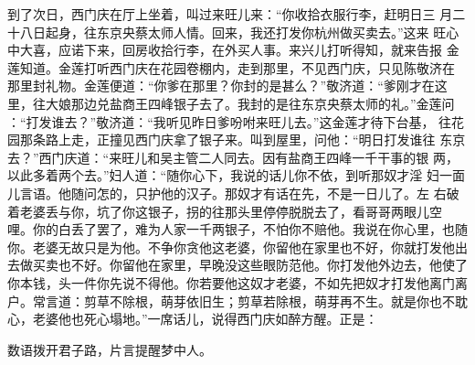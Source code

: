 到了次日，西门庆在厅上坐着，叫过来旺儿来：“你收拾衣服行李，赶明日三
月二十八日起身，往东京央蔡太师人情。回来，我还打发你杭州做买卖去。”这来
旺心中大喜，应诺下来，回房收拾行李，在外买人事。来兴儿打听得知，就来告报
金莲知道。金莲打听西门庆在花园卷棚内，走到那里，不见西门庆，只见陈敬济在
那里封礼物。金莲便道：“你爹在那里？你封的是甚么？”敬济道：“爹刚才在这
里，往大娘那边兑盐商王四峰银子去了。我封的是往东京央蔡太师的礼。”金莲问
：“打发谁去？”敬济道：“我听见昨日爹吩咐来旺儿去。”这金莲才待下台基，
往花园那条路上走，正撞见西门庆拿了银子来。叫到屋里，问他：“明日打发谁往
东京去？”西门庆道：“来旺儿和吴主管二人同去。因有盐商王四峰一千干事的银
两，以此多着两个去。”妇人道：“随你心下，我说的话儿你不依，到听那奴才淫
妇一面儿言语。他随问怎的，只护他的汉子。那奴才有话在先，不是一日儿了。左
右破着老婆丢与你，坑了你这银子，拐的往那头里停停脱脱去了，看哥哥两眼儿空
哩。你的白丢了罢了，难为人家一千两银子，不怕你不赔他。我说在你心里，也随
你。老婆无故只是为他。不争你贪他这老婆，你留他在家里也不好，你就打发他出
去做买卖也不好。你留他在家里，早晚没这些眼防范他。你打发他外边去，他使了
你本钱，头一件你先说不得他。你若要他这奴才老婆，不如先把奴才打发他离门离
户。常言道：剪草不除根，萌芽依旧生；剪草若除根，萌芽再不生。就是你也不耽
心，老婆他也死心塌地。”一席话儿，说得西门庆如醉方醒。正是：

数语拨开君子路，片言提醒梦中人。